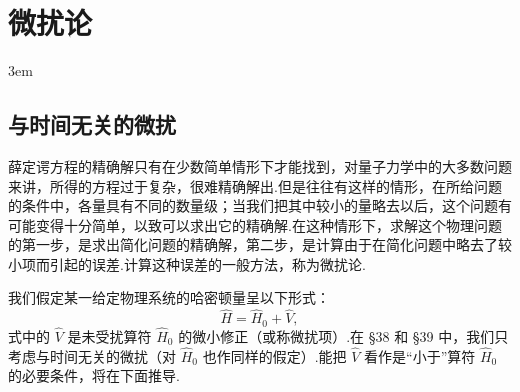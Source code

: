 %
\chapter{微扰论}
\emergencystretch 3em

\section{与时间无关的微扰}

薛定谔方程的精确解只有在少数简单情形下才能找到，对量子力学中的大多数问题来讲，所得的方程过于复杂，很难精确解出.但是往往有这样的情形，在所给问题的条件中，各量具有不同的数量级；当我们把其中较小的量略去以后，这个问题有可能变得十分简单，以致可以求出它的精确解.在这种情形下，求解这个物理问题的第一步，是求出简化问题的精确解，第二步，是计算由于在简化问题中略去了较小项而引起的误差.计算这种误差的一般方法，称为微扰论.

我们假定某一给定物理系统的哈密顿量呈以下形式：
\begin{equation*}
  \hat{H}=\hat{H}_0+\hat{V},
\end{equation*}
式中的 $\hat{V}$ 是未受扰算符 $\hat{H}_0$ 的微小修正（或称微扰项）.在 §38 和 §39 中，我们只考虑与时间无关的微扰（对 $\hat{H}_0$ 也作同样的假定）.能把 $\hat{V}$ 看作是“小于”算符 $\hat{H}_0$ 的必要条件，将在下面推导.

